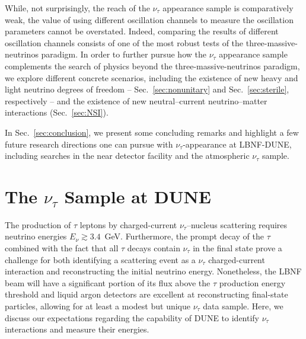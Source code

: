 \documentclass[aps,prd,onecolumn,nofootinbib,superscriptaddress, 11pt]{revtex4}
\begin{document}
While, not surprisingly, the reach of the $\nu_{\tau}$ appearance sample is comparatively weak, the value of using different oscillation channels to measure the oscillation parameters cannot be overstated. Indeed, comparing the results of different oscillation channels consists of one of the most robust tests of the three-massive-neutrinos paradigm.  In order to further pursue how the $\nu_{\tau}$ appearance sample complements the search of physics beyond the three-massive-neutrinos paradigm, we explore different concrete scenarios, including the existence of new heavy and light neutrino degrees of freedom -- Sec.~\ref{sec:nonunitary} and Sec.~\ref{sec:sterile}, respectively -- and the existence of new neutral--current neutrino--matter interactions (Sec.~\ref{sec:NSI}).

In Sec.~\ref{sec:conclusion}, we present some concluding remarks and highlight a few future research directions one can pursue with $\nu_{\tau}$-appearance at LBNF-DUNE, including searches in the near detector facility and the atmospheric $\nu_{\tau}$ sample. 

\setcounter{equation}{0}
\section{The $\nu_{\tau}$ Sample at DUNE}
\label{sec:DUNE}

The production of $\tau$ leptons by charged-current $\nu_{\tau}$--nucleus scattering requires neutrino energies $E_\nu \gtrsim 3.4$~GeV. Furthermore, the prompt decay of the $\tau$ combined with the fact that all $\tau$ decays contain $\nu_{\tau}$ in the final state prove a challenge for both identifying a scattering event as a $\nu_\tau$ charged-current interaction and reconstructing the initial neutrino energy. Nonetheless, the LBNF beam will have a significant portion of its flux above the $\tau$ production energy threshold and liquid argon detectors are excellent at reconstructing final-state particles, allowing for at least a modest but unique  $\nu_{\tau}$ data sample. Here, we discuss our expectations regarding the capability of DUNE to identify $\nu_{\tau}$ interactions and measure their energies.
\end{document}
